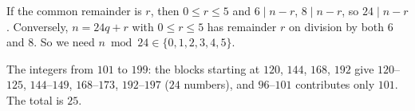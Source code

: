 If the common remainder is $r$, then $0\le r\le5$ and $6\mid n-r$, $8\mid n-r$, so $24\mid n-r$. Conversely, $n=24q+r$ with $0\le r\le 5$ has remainder $r$ on division by both $6$ and $8$. So we need $n\bmod 24\in\{0,1,2,3,4,5\}$.

The integers from $101$ to $199$: the blocks starting at $120$, $144$, $168$, $192$ give $120$--$125$, $144$--$149$, $168$--$173$, $192$--$197$ ($24$ numbers), and $96$--$101$ contributes only $101$. The total is $\boxed{25}$.
